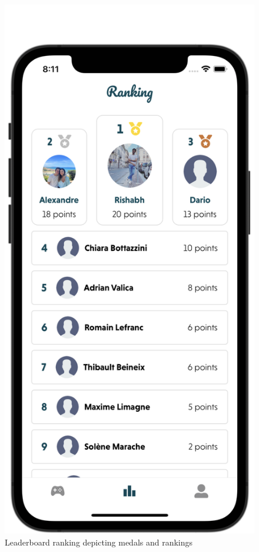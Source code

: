 \begin{figure}[H]
\begin{minipage}[b]{0.3\linewidth}
        \caption{Leaderboard ranking depicting medals and rankings}
    \end{minipage}
    \hspace{0.02\linewidth}
    \begin{minipage}[b]{0.3\linewidth}
        \centering
        \includegraphics[width=\linewidth]{Mobile UI/Final Leaderboard.png}

\end{minipage}
\end{figure}
